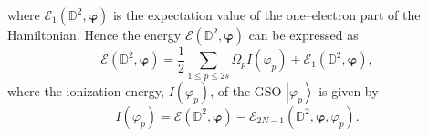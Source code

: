 \documentclass[aps,preprint]{revtex4}%
\begin{document}
where $\mathcal{E}_{1}\left(  \mathbb{D}^{2},\boldsymbol{\varphi}\right)  $ is
the expectation value of the one--electron part of the Hamiltonian. Hence the
energy $\mathcal{E}\left(  \mathbb{D}^{2},\boldsymbol{\varphi}\right)  $ can
be expressed as
\begin{equation}
\mathcal{E}\left(  \mathbb{D}^{2},\boldsymbol{\varphi}\right)  =\frac{1}%
{2}\sum_{1\leq p\leq2s}\Omega_{p}I\left(  \varphi_{p}\right)  +\mathcal{E}%
_{1}\left(  \mathbb{D}^{2},\boldsymbol{\varphi}\right)  , \label{TEexpec}%
\end{equation}
where the ionization energy, $I\left(  \varphi_{p}\right)  $, of the GSO
$\left\vert \varphi_{p}\right\rangle $ is given by
\begin{equation}
I\left(  \varphi_{p}\right)  =\mathcal{E}\left(  \mathbb{D}^{2}%
,\boldsymbol{\varphi}\right)  -\mathcal{E}_{2N-1}\left(  \mathbb{D}%
^{2},\boldsymbol{\varphi},\varphi_{p}\right)  .
\end{equation}
\end{document}
